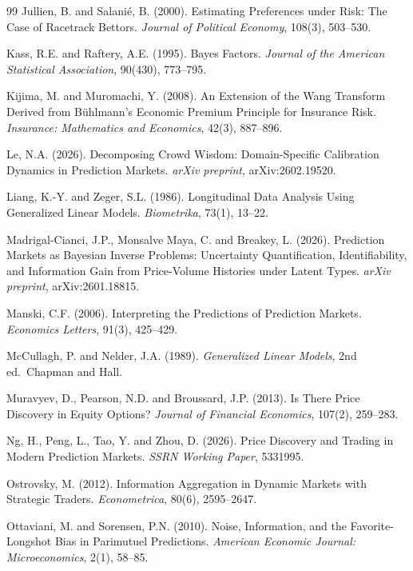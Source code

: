 \documentclass[12pt,a4paper]{article}
\begin{document}
\begin{thebibliography}{99}
 Jullien, B. and Salanié, B. (2000). Estimating Preferences under Risk:
  The Case of Racetrack Bettors. \emph{Journal of Political Economy},
  108(3), 503--530.

 Kass, R.E. and Raftery, A.E. (1995). Bayes Factors. \emph{Journal of
  the American Statistical Association}, 90(430), 773--795.

 Kijima, M. and Muromachi, Y. (2008). An Extension of the Wang
  Transform Derived from Bühlmann's Economic Premium Principle for
  Insurance Risk. \emph{Insurance: Mathematics and Economics}, 42(3),
  887--896.

 Le, N.A. (2026). Decomposing Crowd Wisdom: Domain-Specific Calibration
  Dynamics in Prediction Markets. \emph{arXiv preprint},
  arXiv:2602.19520.

 Liang, K.-Y. and Zeger, S.L. (1986). Longitudinal Data Analysis Using
  Generalized Linear Models. \emph{Biometrika}, 73(1), 13--22.

 Madrigal-Cianci, J.P., Monsalve Maya, C. and Breakey, L. (2026).
  Prediction Markets as Bayesian Inverse Problems: Uncertainty
  Quantification, Identifiability, and Information Gain from
  Price-Volume Histories under Latent Types. \emph{arXiv preprint},
  arXiv:2601.18815.

 Manski, C.F. (2006). Interpreting the Predictions of Prediction
  Markets. \emph{Economics Letters}, 91(3), 425--429.

 McCullagh, P. and Nelder, J.A. (1989). \emph{Generalized Linear
  Models}, 2nd ed.~Chapman and Hall.

 Muravyev, D., Pearson, N.D. and Broussard, J.P. (2013). Is There Price
  Discovery in Equity Options? \emph{Journal of Financial Economics},
  107(2), 259--283.

 Ng, H., Peng, L., Tao, Y. and Zhou, D. (2026). Price Discovery and
  Trading in Modern Prediction Markets. \emph{SSRN Working Paper},
  5331995.

 Ostrovsky, M. (2012). Information Aggregation in Dynamic Markets with
  Strategic Traders. \emph{Econometrica}, 80(6), 2595--2647.

 Ottaviani, M. and Sorensen, P.N. (2010). Noise, Information, and the
  Favorite-Longshot Bias in Parimutuel Predictions. \emph{American
  Economic Journal: Microeconomics}, 2(1), 58--85.


\end{thebibliography}
\end{document}
